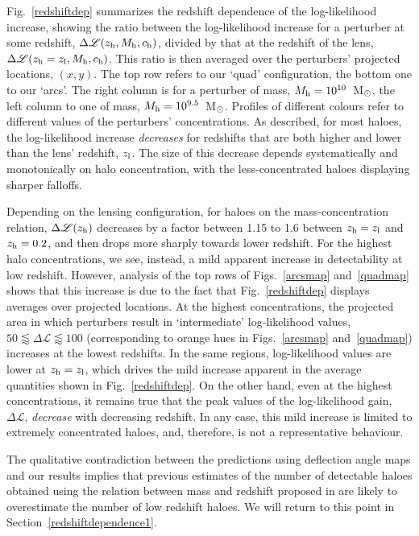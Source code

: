 \documentclass[a4paper, fleqn, usenatbib, useAMS]{mnras}
\def\DL{\Delta\mathscr{L}}
\begin{document}
Fig.~\ref{redshiftdep} summarizes the redshift dependence of the log-likelihood
increase, showing the ratio between the log-likelihood increase for a perturber at some redshift, $\DL(z_{\rm h},M_{\rm h},c_{\rm h})$, 
divided by that at the redshift of the lens,  $\DL(z_{\rm h}=z_{\rm l},M_{\rm h},c_{\rm h})$.
This ratio is then averaged over the perturbers' projected locations, $(x,y)$. The top row refers to our `quad' configuration,
the bottom one to our `arcs'. The right column is for a perturber of
mass, $M_{\rm h}=10^{10}$~M$_{\rm \odot}$, the left column to one of 
mass,  $M_{\rm h}=10^{9.5}$~M$_{\rm \odot}$. Profiles of different colours refer to different values of the perturbers' 
 concentrations. As described, for most haloes, the log-likelihood increase {\it decreases} for redshifts that are
 both higher and lower than the lens' redshift, $z_{\rm l}$. The size of this decrease depends systematically 
 and monotonically on halo concentration, with the less-concentrated haloes displaying sharper falloffs. 

 Depending on the lensing configuration, for haloes on the mass-concentration relation, $\DL(z_{\rm h})$ 
 decreases by a factor between 1.15 to 1.6 between $z_{\rm h}=z_{\rm
   l}$ and $z_{\rm h}=0.2$, and then 
 drops more sharply towards lower redshift.
 For the highest halo concentrations, we see, instead, a mild apparent increase in detectability at low redshift. However, analysis of the top rows 
 of Figs.~\ref{arcsmap} and~\ref{quadmap} shows that this increase is due to the 
 fact that Fig.~\ref{redshiftdep} displays averages over projected
 locations. At the highest concentrations, the projected area in which
 perturbers result in `intermediate' log-likelihood values,
 $50\lessapprox\DL\lessapprox100$ (corresponding to orange hues in
 Figs.~\ref{arcsmap} and~\ref{quadmap}) increases at the lowest redshifts. In the same regions, log-likelihood values are 
 lower at $z_{\rm h}=z_{\rm l}$, which drives the mild increase apparent in the average quantities shown in Fig.~\ref{redshiftdep}. On the other hand, even at the highest concentrations, it remains true that the peak values of the log-likelihood gain, $\DL$, {\it decrease} with decreasing redshift.
 In any case, this mild increase is limited 
 to extremely concentrated haloes, and, therefore, is not a representative behaviour. 
 
 The qualitative contradiction between the predictions using deflection angle maps and our results implies 
 that previous estimates of the number of detectable haloes obtained  using the relation between mass and redshift 
 proposed in \citet{Despali2018} are likely to overestimate the number of low redshift haloes. 
 We will return to this point in Section~\ref{redshiftdependence1}.
\end{document}

